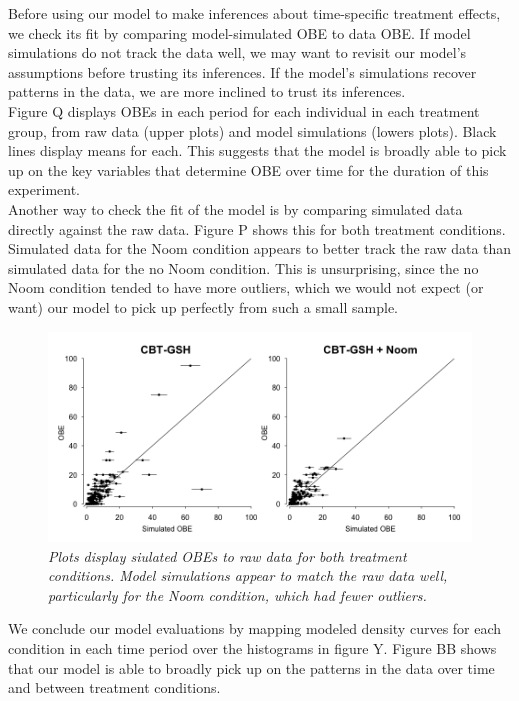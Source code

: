 \documentclass[12pt, oneside]{article}
\begin{document}
Before using our model to make inferences about time-specific treatment effects, we check its fit by comparing model-simulated OBE to data OBE.  If model simulations do not track the data well, we may want to revisit our model's assumptions before trusting its inferences.  If the model's simulations recover patterns in the data, we are more inclined to trust its inferences.  
\\

Figure Q displays OBEs in each period for each individual in each treatment group, from raw data (upper plots) and model simulations (lowers plots).  Black lines display means for each.  This suggests that the model is broadly able to pick up on the key variables that determine OBE over time for the duration of this experiment.
\\

Another way to check the fit of the model is by comparing simulated data directly against the raw data.  Figure P shows this for both treatment conditions.  Simulated data for the Noom condition appears to better track the raw data than simulated data for the no Noom condition.  This is unsurprising, since the no Noom condition tended to have more outliers, which we would not expect (or want) our model to pick up perfectly from such a small sample.  
\\

\begin{figure}
\centering
\includegraphics[width=\textwidth, height=\textheight, keepaspectratio]{obe_ppcs.png}
\caption{\emph{Plots display siulated OBEs to raw data for both treatment conditions.  Model simulations appear to match the raw data well, particularly for the Noom condition, which had fewer outliers.}}
\end{figure}

We conclude our model evaluations by mapping modeled density curves for each condition in each time period over the histograms in figure Y.  Figure BB shows that our model is able to broadly pick up on the patterns in the data over time and between treatment conditions.
\end{document}
